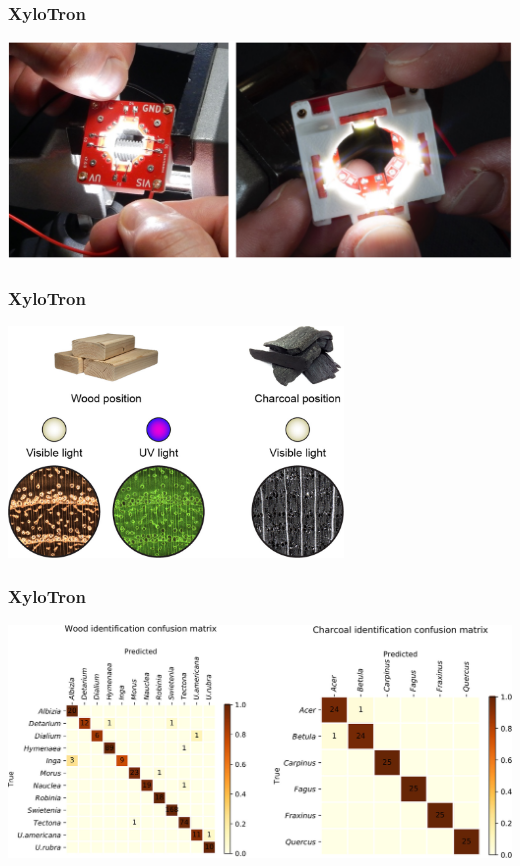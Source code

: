 \documentclass{presentation}
\begin{document}
\begin{frame}\frametitle{XyloTron}
  \centering
  \includegraphics[width=\textwidth]{"./xylotron-leds.png"}
\end{frame}

\begin{frame}\frametitle{XyloTron}
  \centering
  \includegraphics[width=3.5in]{"./fpls-11-01015-g001.jpg"}
\end{frame}

\begin{frame}\frametitle{XyloTron}
  \centering
  \includegraphics[width=\textwidth]{"./fpls-11-01015-g005.jpg"}
\end{frame}
\end{document}

